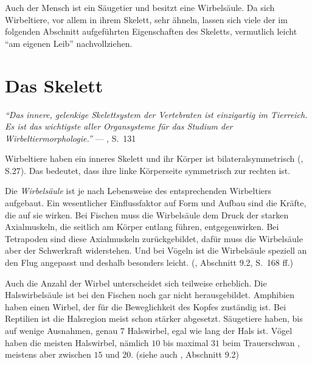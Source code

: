 Auch der Mensch ist ein Säugetier und besitzt eine Wirbelsäule. Da sich Wirbeltiere, vor allem in ihrem Skelett, sehr ähneln, lassen sich viele der im folgenden Abschnitt aufgeführten Eigenschaften des Skeletts, vermutlich leicht "`am eigenen Leib"' nachvollziehen.


\section{Das Skelett}
\label{biology_skeleton}

\vspace{0.5cm}
\begin{center}
 \begin{minipage}{12cm}
  \emph{"`Das innere, gelenkige Skelettsystem der Vertebraten ist einzigartig im Tierreich. Es ist das wichtigste aller Organsysteme für das Studium der Wirbeltiermorphologie."'}
  --- \cite{Vergleichende_Anatomie}, S.\ 131
 \end{minipage}
\end{center}


Wirbeltiere haben ein inneres Skelett und ihr Körper ist bilateralsymmetrisch (\cite{Vergleichende_Anatomie}, S.27). Das bedeutet, dass ihre linke Körperseite symmetrisch zur rechten ist. 

Die \emph{Wirbelsäule} ist je nach Lebensweise des entsprechenden Wirbeltiers aufgebaut. Ein wesentlicher Einflussfaktor auf Form und Aufbau sind die Kräfte, die auf sie wirken. 
Bei Fischen muss die Wirbelsäule dem Druck der starken Axialmuskeln, die seitlich am Körper entlang führen, entgegenwirken.
Bei Tetrapoden sind diese Axialmuskeln zurückgebildet, dafür muss die Wirbelsäule aber der Schwerkraft widerstehen.
Und bei Vögeln ist die Wirbelsäule speziell an den Flug angepasst und deshalb \ua besonders leicht. (\cite{Vergleichende_Anatomie}, Abschnitt 9.2, S.\ 168 ff.)

Auch die Anzahl der Wirbel unterscheidet sich teilweise erheblich. 
Die Halswirbelsäule ist \zb bei den Fischen noch gar nicht herausgebildet. Amphibien haben einen Wirbel, der für die Beweglichkeit des Kopfes zuständig ist. Bei Reptilien ist die Halsregion meist schon stärker abgesetzt. Säugetiere haben, bis auf wenige Ausnahmen, genau $7$ Halswirbel, egal wie lang der Hals ist. Vögel haben die meisten Halswirbel, nämlich $10$ bis maximal $31$ beim Trauerschwan \cite{WikipediaVogelskelett}, meistens aber zwischen $15$ und $20$. (siehe auch \cite{Vergleichende_Anatomie}, Abschnitt 9.2)

